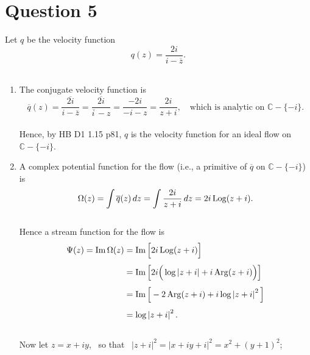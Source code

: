 \newpage
\section{Question 5}
Let $q$ be the velocity function
\[
q(z) = \frac{2i}{i - \overline{z}}.
\]
\vs \\
\begin{enumerate}[label=(\alph*)]
  \item %
  The conjugate velocity function is
  \vs \\
  \[
  \overline{q}(z) = \overline{\frac{2i}{i - \overline{z}}} = \frac{\overline{2i}}{\overline{i\,} - z}= \frac{-2i}{-i - z} = \frac{2i}{z + i}, \quad \text{which is analytic on \ }\mathbb{C} - \{-i\}.
  \]
  \vs \\
  Hence, by HB D1 1.15 p81, $q$ is the velocity function for an ideal flow on $\mathbb{C} - \{-i\}$.
  \vvs \\
  \item %
  A complex potential function for the flow  \big(i.e., a primitive of $\overline{q}$ on $\mathbb{C} - \{-i\}$\big) is
  \vs \\
  \[
  \Omega(z) = \int \overline{q}(z)\,dz = \int \frac{2i}{z + i}\,dz = 2i\operatorname{Log} (z + i).
  \]
  \vs \\
  Hence a stream function for the flow is
  \vs \\
  \begin{align*}
    \Psi(z) = \Im \Omega(z) &= \Im \Big[2i\operatorname{Log}(z + i)\Big] \\[4pt]
    &= \Im \Big[  2i \Big(\log \left| z + i \right| + i\operatorname{Arg} (z + i)\Big)\Big] \\[4pt]
    &= \Im \Big[ -2\operatorname{Arg}(z + i) + i \log \left| z + i\right|^2\Big] \\[4pt]
    &= \log\left| z + i\right|^2.
  \end{align*}
  \vs \\
  Now let $z = x + iy$, \ so  that \ $\left|z + i\right|^2 = \left| x + iy + i\right|^2 = x^2 + (y + 1)^2$; 


\end{enumerate}
